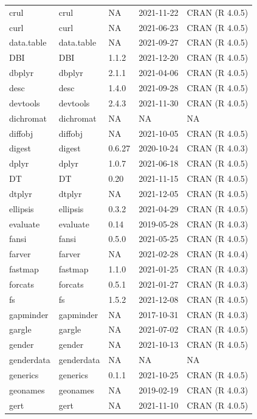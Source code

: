 \begin{tabular}{lllll}
\addlinespace
crul & crul & NA & 2021-11-22 & CRAN (R 4.0.5)\\
curl & curl & NA & 2021-06-23 & CRAN (R 4.0.5)\\
data.table & data.table & NA & 2021-09-27 & CRAN (R 4.0.5)\\
DBI & DBI & 1.1.2 & 2021-12-20 & CRAN (R 4.0.5)\\
dbplyr & dbplyr & 2.1.1 & 2021-04-06 & CRAN (R 4.0.5)\\
\addlinespace
desc & desc & 1.4.0 & 2021-09-28 & CRAN (R 4.0.5)\\
devtools & devtools & 2.4.3 & 2021-11-30 & CRAN (R 4.0.5)\\
dichromat & dichromat & NA & NA & NA\\
diffobj & diffobj & NA & 2021-10-05 & CRAN (R 4.0.5)\\
digest & digest & 0.6.27 & 2020-10-24 & CRAN (R 4.0.3)\\
\addlinespace
dplyr & dplyr & 1.0.7 & 2021-06-18 & CRAN (R 4.0.5)\\
DT & DT & 0.20 & 2021-11-15 & CRAN (R 4.0.5)\\
dtplyr & dtplyr & NA & 2021-12-05 & CRAN (R 4.0.5)\\
ellipsis & ellipsis & 0.3.2 & 2021-04-29 & CRAN (R 4.0.5)\\
evaluate & evaluate & 0.14 & 2019-05-28 & CRAN (R 4.0.3)\\
\addlinespace
fansi & fansi & 0.5.0 & 2021-05-25 & CRAN (R 4.0.5)\\
farver & farver & NA & 2021-02-28 & CRAN (R 4.0.4)\\
fastmap & fastmap & 1.1.0 & 2021-01-25 & CRAN (R 4.0.3)\\
forcats & forcats & 0.5.1 & 2021-01-27 & CRAN (R 4.0.3)\\
fs & fs & 1.5.2 & 2021-12-08 & CRAN (R 4.0.5)\\
\addlinespace
gapminder & gapminder & NA & 2017-10-31 & CRAN (R 4.0.3)\\
gargle & gargle & NA & 2021-07-02 & CRAN (R 4.0.5)\\
gender & gender & NA & 2021-10-13 & CRAN (R 4.0.5)\\
genderdata & genderdata & NA & NA & NA\\
generics & generics & 0.1.1 & 2021-10-25 & CRAN (R 4.0.5)\\
\addlinespace
geonames & geonames & NA & 2019-02-19 & CRAN (R 4.0.3)\\
gert & gert & NA & 2021-11-10 & CRAN (R 4.0.5)\\

\end{tabular}
